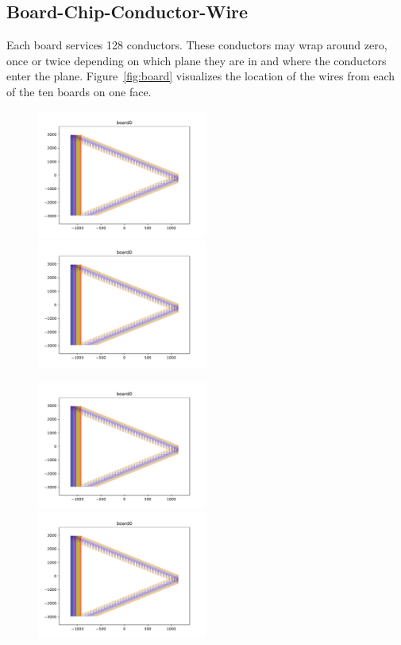 \documentclass[pdftex,12pt,letter]{article}
\begin{document}
\subsection{Board-Chip-Conductor-Wire}

Each board services 128 conductors.  These conductors may wrap around
zero, once or twice depending on which plane they are in and where the
conductors enter the plane.  Figure~\ref{fig:board} visualizes the
location of the wires from each of the ten boards on one face.

\begin{figure}[h]
  \centering
  \includegraphics[width=0.5\textwidth,page=1]{test_plot_board.pdf}%
  \includegraphics[width=0.5\textwidth,page=2]{test_plot_board.pdf}

  \includegraphics[width=0.5\textwidth,page=3]{test_plot_board.pdf}%
  \includegraphics[width=0.5\textwidth,page=4]{test_plot_board.pdf}


\end{figure}
\end{document}
